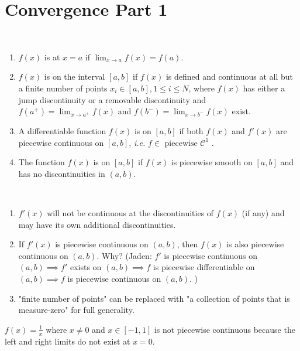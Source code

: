 \documentclass[class=article,crop=false]{standalone}
\begin{document}
\newpage
\section{Convergence Part 1}

~\begin{defn}[]
\begin{enumerate}[label=\arabic*)]
	\item $f(x)$ is  at  $x=a$ if  $\lim_{ x \to a} f(x) = f(a)$.
	\item $f(x)$ is  on the interval $[a,b]$ if  $f(x)$ is defined and continuous at all but a finite number of points  $x_i \in [a,b], 1\leq i \leq N$, where $f(x)$ has either a jump discontinuity or a removable discontinuity and  $f(a^+) = \lim_{ x \to a^+} f(x) $ and $f(b^-) = \lim_{ x \to b^-} f(x) $ exist.
	\item A differentiable function $f(x)$ is  on $[a,b]$ if both  $f(x)$ and  $f'(x)$ are piecewise continuous on  $[a,b]$, \emph{i.e.} $f \in \text{ piecewise } \mathcal{C}^1$ .
	\item The function  $f(x)$ is  on  $[a,b]$ if  $f(x)$ is piecewise smooth on $[a,b]$ and has no discontinuities in  $(a,b)$.
\end{enumerate}
\end{defn}
\begin{note}[]
~\begin{enumerate}[label=\alph*)]
	\item $f'(x)$ will not be continuous at the discontinuities of  $f(x)$ (if any) and may have its own additional discontinuities.
	\item If  $f'(x)$ is piecewise continuous on  $(a,b)$, then  $f(x)$ is also piecewise continuous on  $(a,b)$. Why? (Jaden: $f'$ is piecewise continuous on $(a,b) \implies f'$ exists on $(a,b) \implies f$ is piecewise differentiable on $(a,b) \implies f$ is piecewise continuous on $(a,b)$. ) 
	\item "finite number of points" can be replaced with "a collection of points that is measure-zero" for full generality.
\end{enumerate}
\end{note}
\begin{eg}[]
	$f(x) = \frac{1}{x}$ where $x\neq 0$ and $x \in [-1,1]$ is not piecewise continuous because the left and right limits do not exist at $x=0$.
\end{eg}
\end{document}
